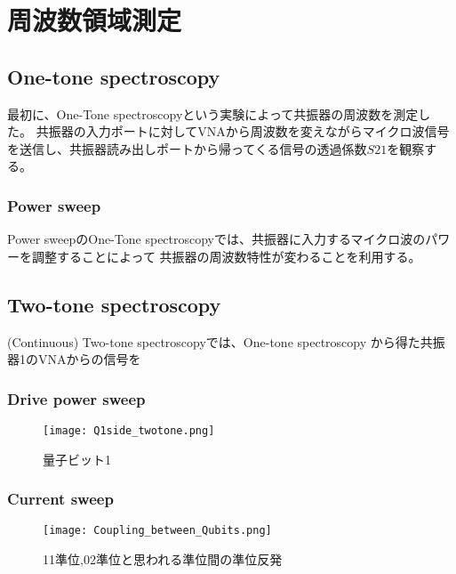 \section{周波数領域測定}
    \subsection{One-tone spectroscopy}
最初に、One-Tone spectroscopyという実験によって共振器の周波数を測定した。
共振器の入力ポートに対してVNAから周波数を変えながらマイクロ波信号を送信し、共振器読み出しポートから帰ってくる信号の透過係数$S21$を観察する。
\subsubsection{Power sweep}
Power sweepのOne-Tone spectroscopyでは、共振器に入力するマイクロ波のパワーを調整することによって
共振器の周波数特性が変わることを利用する。

\subsection{Two-tone spectroscopy}
(Continuous) Two-tone spectroscopyでは、One-tone spectroscopy から得た共振器1のVNAからの信号を
    \subsubsection{Drive power sweep}
    \begin{figure}[H]
        \begin{center}
            \texttt{[image: Q1side\_twotone.png]}
            \caption{量子ビット1}
        \end{center}
    \end{figure}
    \subsubsection{Current sweep}


    \begin{figure}[H]
        \begin{center}
            \texttt{[image: Coupling\_between\_Qubits.png]}
            \caption{11準位,02準位と思われる準位間の準位反発}
        \end{center}
    \end{figure}
